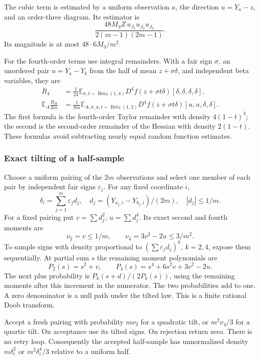 The cubic term is estimated by a uniform observation $a$, the
direction $u=Y_a-z$, and an order-three diagram.  Its estimator is
\[
 \frac{48M_3 Z\,u_{J_1}u_{J_2}u_{J_3}}
                         {2(m-1)(2m-1)}.
\]
Its magnitude is at most $48\cdot6M_3/m^2$.

For the fourth-order terms use integral remainders.  With a fair sign
$\sigma$, an unordered pair $u=Y_a-Y_b$ from the half of mean
$z+\sigma\delta$, and independent beta variables, they are
\begin{align}
 R_4&=\frac1{24}\mathbb E_{\sigma,t\sim\operatorname{Beta}(1,4)}
    D^4f(z+\sigma t\delta)[\delta,\delta,\delta,\delta],
 \label{eq:column-quartic-integral}\\
 \mathbb E_A\frac{R_H}{2m}
 &=\frac1{8m}\mathbb E_{A,\sigma,u,t\sim\operatorname{Beta}(1,2)}
    D^4f(z+\sigma t\delta)[u,u,\delta,\delta].
 \label{eq:column-hessian-integral}
\end{align}
The first formula is the fourth-order Taylor remainder with density
$4(1-t)^3$; the second is the second-order remainder of the Hessian
with density $2(1-t)$.  These formulas avoid subtracting nearly equal
random function estimates.

\subsubsection{Exact tilting of a half-sample}

Choose a uniform pairing of the $2m$ observations and select one
member of each pair by independent fair signs $\varepsilon_j$.
For any fixed coordinate $i$,
\[
 \delta_i=\sum_{j=1}^m\varepsilon_jd_j,
 \quad d_j=(Y_{a_j,i}-Y_{b_j,i})/(2m),\quad |d_j|\le1/m.
\]
For a fixed pairing put $v=\sum d_j^2$, $u=\sum d_j^4$.  Its exact
second and fourth moments are
\begin{equation}
 \nu_2=v\le1/m,\qquad
 \nu_4=3v^2-2u\le3/m^2.
 \label{eq:column-pairing-moments}
\end{equation}
To sample signs with density proportional to
$(\sum\varepsilon_jd_j)^k$, $k=2,4$, expose them sequentially.
At partial sum $s$ the remaining moment polynomials are
\[
 P_2(s)=s^2+v,\qquad
 P_4(s)=s^4+6s^2v+3v^2-2u.
\]
The next plus probability is $P_k(s+d)/(2P_k(s))$, using the
remaining moments after this increment in the numerator.  The two
probabilities add to one.  A zero denominator is a null path under
the tilted law.  This is a finite rational Doob transform.

Accept a fresh pairing with probability $m\nu_2$ for a quadratic
tilt, or $m^2\nu_4/3$ for a quartic tilt.  On acceptance use its
tilted signs.  On rejection return zero.  There is no retry loop.
Consequently the accepted half-sample has unnormalized density
$m\delta_i^2$ or $m^2\delta_i^4/3$ relative to a uniform half.


